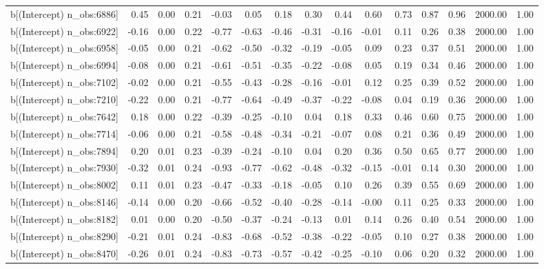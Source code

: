 \begin{table}[ht]
\begin{tabular}{rrrrrrrrrrrrrrr}
  b[(Intercept) n\_obs:6886] & 0.45 & 0.00 & 0.21 & -0.03 & 0.05 & 0.18 & 0.30 & 0.44 & 0.60 & 0.73 & 0.87 & 0.96 & 2000.00 & 1.00 \\ 
  b[(Intercept) n\_obs:6922] & -0.16 & 0.00 & 0.22 & -0.77 & -0.63 & -0.46 & -0.31 & -0.16 & -0.01 & 0.11 & 0.26 & 0.38 & 2000.00 & 1.00 \\ 
  b[(Intercept) n\_obs:6958] & -0.05 & 0.00 & 0.21 & -0.62 & -0.50 & -0.32 & -0.19 & -0.05 & 0.09 & 0.23 & 0.37 & 0.51 & 2000.00 & 1.00 \\ 
  b[(Intercept) n\_obs:6994] & -0.08 & 0.00 & 0.21 & -0.61 & -0.51 & -0.35 & -0.22 & -0.08 & 0.05 & 0.19 & 0.34 & 0.46 & 2000.00 & 1.00 \\ 
  b[(Intercept) n\_obs:7102] & -0.02 & 0.00 & 0.21 & -0.55 & -0.43 & -0.28 & -0.16 & -0.01 & 0.12 & 0.25 & 0.39 & 0.52 & 2000.00 & 1.00 \\ 
  b[(Intercept) n\_obs:7210] & -0.22 & 0.00 & 0.21 & -0.77 & -0.64 & -0.49 & -0.37 & -0.22 & -0.08 & 0.04 & 0.19 & 0.36 & 2000.00 & 1.00 \\ 
  b[(Intercept) n\_obs:7642] & 0.18 & 0.00 & 0.22 & -0.39 & -0.25 & -0.10 & 0.04 & 0.18 & 0.33 & 0.46 & 0.60 & 0.75 & 2000.00 & 1.00 \\ 
  b[(Intercept) n\_obs:7714] & -0.06 & 0.00 & 0.21 & -0.58 & -0.48 & -0.34 & -0.21 & -0.07 & 0.08 & 0.21 & 0.36 & 0.49 & 2000.00 & 1.00 \\ 
  b[(Intercept) n\_obs:7894] & 0.20 & 0.01 & 0.23 & -0.39 & -0.24 & -0.10 & 0.04 & 0.20 & 0.36 & 0.50 & 0.65 & 0.77 & 2000.00 & 1.00 \\ 
  b[(Intercept) n\_obs:7930] & -0.32 & 0.01 & 0.24 & -0.93 & -0.77 & -0.62 & -0.48 & -0.32 & -0.15 & -0.01 & 0.14 & 0.30 & 2000.00 & 1.00 \\ 
  b[(Intercept) n\_obs:8002] & 0.11 & 0.01 & 0.23 & -0.47 & -0.33 & -0.18 & -0.05 & 0.10 & 0.26 & 0.39 & 0.55 & 0.69 & 2000.00 & 1.00 \\ 
  b[(Intercept) n\_obs:8146] & -0.14 & 0.00 & 0.20 & -0.66 & -0.52 & -0.40 & -0.28 & -0.14 & -0.00 & 0.11 & 0.25 & 0.33 & 2000.00 & 1.00 \\ 
  b[(Intercept) n\_obs:8182] & 0.01 & 0.00 & 0.20 & -0.50 & -0.37 & -0.24 & -0.13 & 0.01 & 0.14 & 0.26 & 0.40 & 0.54 & 2000.00 & 1.00 \\ 
  b[(Intercept) n\_obs:8290] & -0.21 & 0.01 & 0.24 & -0.83 & -0.68 & -0.52 & -0.38 & -0.22 & -0.05 & 0.10 & 0.27 & 0.38 & 2000.00 & 1.00 \\ 
  b[(Intercept) n\_obs:8470] & -0.26 & 0.01 & 0.24 & -0.83 & -0.73 & -0.57 & -0.42 & -0.25 & -0.10 & 0.06 & 0.20 & 0.32 & 2000.00 & 1.00 \\ 

\end{tabular}
\end{table}

